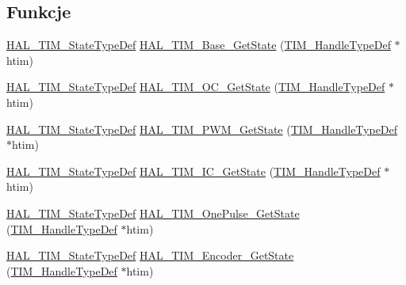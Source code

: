 \subsection*{Funkcje}
\begin{DoxyCompactItemize}
\item 
\hyperlink{group___t_i_m___exported___types_gae0994cf5970e56ca4903e9151f40010c}{H\+A\+L\+\_\+\+T\+I\+M\+\_\+\+State\+Type\+Def} \hyperlink{group___t_i_m___exported___functions___group10_gabf71ed10e30d23139f7b327878901c89}{H\+A\+L\+\_\+\+T\+I\+M\+\_\+\+Base\+\_\+\+Get\+State} (\hyperlink{struct_t_i_m___handle_type_def}{T\+I\+M\+\_\+\+Handle\+Type\+Def} $\ast$htim)
\item 
\hyperlink{group___t_i_m___exported___types_gae0994cf5970e56ca4903e9151f40010c}{H\+A\+L\+\_\+\+T\+I\+M\+\_\+\+State\+Type\+Def} \hyperlink{group___t_i_m___exported___functions___group10_ga9dbca6a4ca949a13fda097d9cc7959a0}{H\+A\+L\+\_\+\+T\+I\+M\+\_\+\+O\+C\+\_\+\+Get\+State} (\hyperlink{struct_t_i_m___handle_type_def}{T\+I\+M\+\_\+\+Handle\+Type\+Def} $\ast$htim)
\item 
\hyperlink{group___t_i_m___exported___types_gae0994cf5970e56ca4903e9151f40010c}{H\+A\+L\+\_\+\+T\+I\+M\+\_\+\+State\+Type\+Def} \hyperlink{group___t_i_m___exported___functions___group10_ga207c64afb37d15e35b5380d4805e6eaf}{H\+A\+L\+\_\+\+T\+I\+M\+\_\+\+P\+W\+M\+\_\+\+Get\+State} (\hyperlink{struct_t_i_m___handle_type_def}{T\+I\+M\+\_\+\+Handle\+Type\+Def} $\ast$htim)
\item 
\hyperlink{group___t_i_m___exported___types_gae0994cf5970e56ca4903e9151f40010c}{H\+A\+L\+\_\+\+T\+I\+M\+\_\+\+State\+Type\+Def} \hyperlink{group___t_i_m___exported___functions___group10_ga8f6d20b8e4f3255f1f0f3ced8ea684e8}{H\+A\+L\+\_\+\+T\+I\+M\+\_\+\+I\+C\+\_\+\+Get\+State} (\hyperlink{struct_t_i_m___handle_type_def}{T\+I\+M\+\_\+\+Handle\+Type\+Def} $\ast$htim)
\item 
\hyperlink{group___t_i_m___exported___types_gae0994cf5970e56ca4903e9151f40010c}{H\+A\+L\+\_\+\+T\+I\+M\+\_\+\+State\+Type\+Def} \hyperlink{group___t_i_m___exported___functions___group10_gab66fcfc1ee00512f50ef56f4397a0e9f}{H\+A\+L\+\_\+\+T\+I\+M\+\_\+\+One\+Pulse\+\_\+\+Get\+State} (\hyperlink{struct_t_i_m___handle_type_def}{T\+I\+M\+\_\+\+Handle\+Type\+Def} $\ast$htim)
\item 
\hyperlink{group___t_i_m___exported___types_gae0994cf5970e56ca4903e9151f40010c}{H\+A\+L\+\_\+\+T\+I\+M\+\_\+\+State\+Type\+Def} \hyperlink{group___t_i_m___exported___functions___group10_ga1925971e419b85db7fed57919ba765ef}{H\+A\+L\+\_\+\+T\+I\+M\+\_\+\+Encoder\+\_\+\+Get\+State} (\hyperlink{struct_t_i_m___handle_type_def}{T\+I\+M\+\_\+\+Handle\+Type\+Def} $\ast$htim)
\end{DoxyCompactItemize}


